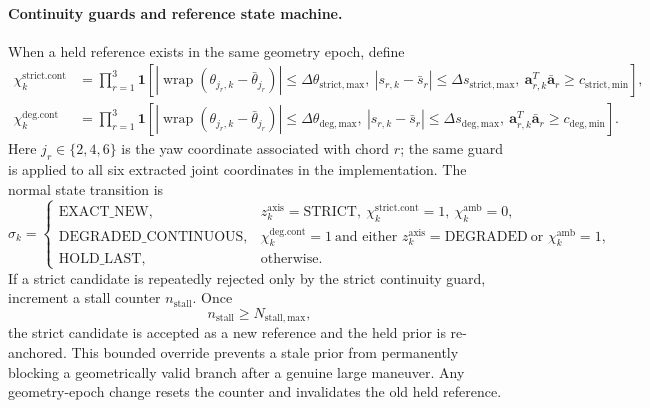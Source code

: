 \documentclass[12pt,a4paper]{report}
\begin{document}
\paragraph{Continuity guards and reference state machine.}
When a held reference exists in the same geometry epoch, define
\begin{align}
\chi_k^{\mathrm{strict.cont}}
&=\prod_{r=1}^{3}\mathbf{1}\!\left[
|\operatorname{wrap}(\theta_{j_r,k}-\bar\theta_{j_r})|
\leq\Delta\theta_{\mathrm{strict,max}},\
|s_{r,k}-\bar s_r|\leq\Delta s_{\mathrm{strict,max}},\
\mathbf{a}_{r,k}^{T}\bar{\mathbf{a}}_r
\geq c_{\mathrm{strict,min}}\right],
\tag{8.117}\\
\chi_k^{\mathrm{deg.cont}}
&=\prod_{r=1}^{3}\mathbf{1}\!\left[
|\operatorname{wrap}(\theta_{j_r,k}-\bar\theta_{j_r})|
\leq\Delta\theta_{\mathrm{deg,max}},\
|s_{r,k}-\bar s_r|\leq\Delta s_{\mathrm{deg,max}},\
\mathbf{a}_{r,k}^{T}\bar{\mathbf{a}}_r
\geq c_{\mathrm{deg,min}}\right].
\tag{8.118}
\end{align}
Here $j_r\in\{2,4,6\}$ is the yaw coordinate associated with chord $r$;
the same guard is applied to all six extracted joint coordinates in the
implementation. The normal state transition is
\begin{equation}
\sigma_k=
\begin{cases}
\mathrm{EXACT\_NEW},&
z_k^{\mathrm{axis}}=\mathrm{STRICT},\
\chi_k^{\mathrm{strict.cont}}=1,\
\chi_k^{\mathrm{amb}}=0,\\
\mathrm{DEGRADED\_CONTINUOUS},&
\chi_k^{\mathrm{deg.cont}}=1
\ \text{and either }z_k^{\mathrm{axis}}=\mathrm{DEGRADED}
\ \text{or }\chi_k^{\mathrm{amb}}=1,\\
\mathrm{HOLD\_LAST},&\text{otherwise}.
\end{cases}
\tag{8.119}
\label{eq:ch8-reference-status}
\end{equation}
If a strict candidate is repeatedly rejected only by the strict continuity
guard, increment a stall counter $n_{\mathrm{stall}}$. Once
\begin{equation}
n_{\mathrm{stall}}\geq N_{\mathrm{stall,max}},
\tag{8.120}
\label{eq:ch8-stall-override}
\end{equation}
the strict candidate is accepted as a new reference and the held prior is
re-anchored. This bounded override prevents a stale prior from permanently
blocking a geometrically valid branch after a genuine large maneuver. Any
geometry-epoch change resets the counter and invalidates the old held
reference.
\end{document}
